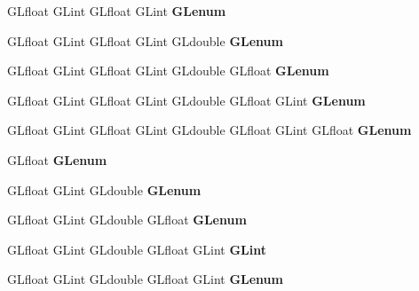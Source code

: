 \begin{DoxyCompactItemize}
G\+Lfloat G\+Lint G\+Lfloat G\+Lint {\bfseries G\+Lenum}
\item 
\mbox{\label{struct_____g_ldispatch_table_rec_a0b7792cb680d65890965e304bad5debf}} 
G\+Lfloat G\+Lint G\+Lfloat G\+Lint G\+Ldouble {\bfseries G\+Lenum}
\item 
\mbox{\label{struct_____g_ldispatch_table_rec_a765f29d6135d571dcdc7b4c0ec9d40b9}} 
G\+Lfloat G\+Lint G\+Lfloat G\+Lint G\+Ldouble G\+Lfloat {\bfseries G\+Lenum}
\item 
\mbox{\label{struct_____g_ldispatch_table_rec_a4b845c392207f56e62180732b7acb07b}} 
G\+Lfloat G\+Lint G\+Lfloat G\+Lint G\+Ldouble G\+Lfloat G\+Lint {\bfseries G\+Lenum}
\item 
\mbox{\label{struct_____g_ldispatch_table_rec_a8d374f712a0652ab0479d1448bac3e7c}} 
G\+Lfloat G\+Lint G\+Lfloat G\+Lint G\+Ldouble G\+Lfloat G\+Lint G\+Lfloat {\bfseries G\+Lenum}
\item 
\mbox{\label{struct_____g_ldispatch_table_rec_a5f7b26756e512327eb187f3cb0729beb}} 
G\+Lfloat {\bfseries G\+Lenum}
\item 
\mbox{\label{struct_____g_ldispatch_table_rec_a3a43226f52ac15821ef3b6631d788eb4}} 
G\+Lfloat G\+Lint G\+Ldouble {\bfseries G\+Lenum}
\item 
\mbox{\label{struct_____g_ldispatch_table_rec_a0efdd39ebd36438b29daaa8323ae1a69}} 
G\+Lfloat G\+Lint G\+Ldouble G\+Lfloat {\bfseries G\+Lenum}
\item 
\mbox{\label{struct_____g_ldispatch_table_rec_a393ff12a5a2b0397c50573349a014115}} 
G\+Lfloat G\+Lint G\+Ldouble G\+Lfloat G\+Lint {\bfseries G\+Lint}
\item 
\mbox{\label{struct_____g_ldispatch_table_rec_a11c5aa4704c8bcf5ab27e79496646193}} 
G\+Lfloat G\+Lint G\+Ldouble G\+Lfloat G\+Lint {\bfseries G\+Lenum}
\item 
\mbox{\label{struct_____g_ldispatch_table_rec_a3e9b7692314c2a693cfb1b464d495b43}} 

\end{DoxyCompactItemize}
